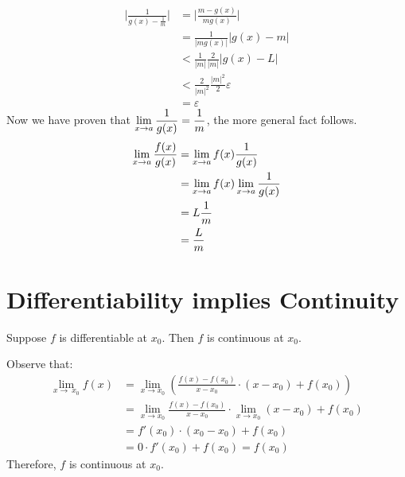 \documentclass[12pt]{article}
\begin{document}
\begin{prf}{}
\begin{enumerate}
    \begin{align*}
        \bigg\vert\frac{1}{g(x) - \frac{1}{m}}\bigg\vert &= \bigg\vert\frac{m - g(x)}{mg(x)}\bigg\vert\\
        &= \frac{1}{|mg(x)|}|g(x) - m|\\
        &< \frac{1}{|m|}\frac{2}{|m|}|g(x) - L|\\
        &< \frac{2}{|m|^2}\frac{|m|^2}{2}\varepsilon\\
        &= \varepsilon
    \end{align*}
    Now we have proven that \(\displaystyle\lim_{x\to a} \frac{1}{g(x)} = \frac{1}{m}\), the more general fact follows.\\
    \begin{align*}
        \displaystyle\lim_{x\to a} \frac{f(x)}{g(x)} &=  \displaystyle\lim_{x\to a} f(x) \frac{1}{g(x)}\\
        &= \displaystyle\lim_{x\to a} f(x)\displaystyle\lim_{x\to a}\frac{1}{g(x)}\\
        &= L\frac{1}{m}\\
        &= \frac{L}{m}
    \end{align*}
\end{enumerate}   
\end{prf}

\section{Differentiability implies Continuity}
\begin{proposition}{}
    Suppose $f$ is differentiable at $x_0$. Then $f$ is continuous at $x_0$.  
\end{proposition}
\begin{prf}{}
Observe that:\\
\begin{align*}
    \lim_{x\to\ x_0}{f(x)} &= \lim_{x\to x_0}{\left(\frac{f(x) - f(x_0)}{x - x_0}\cdot(x-x_0) + f(x_0)      \right)}\\ 
    &= \lim_{x\to x_0}{\frac{f(x) - f(x_0)}{x - x_0}} \cdot \lim_{x\to x_0}{(x - x_0)} + f(x_0)\\
    &= f'(x_0)\cdot (x_0 - x_0) + f(x_0)\\
    &= 0\cdot f'(x_0) + f(x_0) = f(x_0)
\end{align*}
Therefore, $f$ is continuous at $x_0$.
\end{prf}
\end{document}
